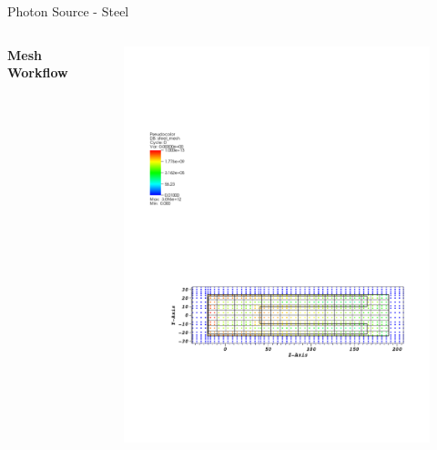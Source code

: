 \documentclass{beamer}
\begin{document}
\begin{frame}{Photon Source - Steel}
\begin{columns}[T]
        \textbf{Mesh Workflow}
        \begin{figure}
                \centering
                \includegraphics[scale=0.49,trim={2.5cm 6cm 1cm 16cm},clip]{figs/src_steel_mesh.pdf}
        \end{figure}

\end{columns}
\end{frame}
\end{document}
